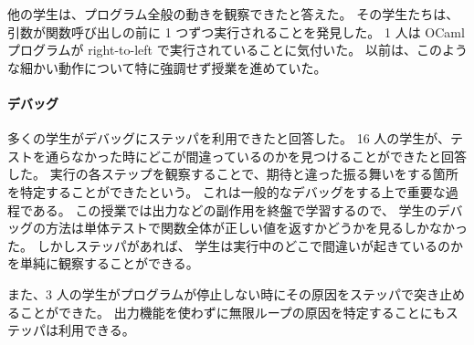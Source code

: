 他の学生は、プログラム全般の動きを観察できたと答えた。
その学生たちは、引数が関数呼び出しの前に 1 つずつ実行されることを発見した。
1 人は OCaml プログラムが right-to-left で実行されていることに気付いた。
以前は、このような細かい動作について特に強調せず授業を進めていた。

\paragraph{デバッグ}
多くの学生がデバッグにステッパを利用できたと回答した。
16 人の学生が、テストを通らなかった時にどこが間違っているのかを見つけることができたと回答した。
実行の各ステップを観察することで、期待と違った振る舞いをする箇所を特定することができたという。
これは一般的なデバッグをする上で重要な過程である。
この授業では出力などの副作用を終盤で学習するので、
学生のデバッグの方法は単体テストで関数全体が正しい値を返すかどうかを見るしかなかった。
しかしステッパがあれば、
学生は実行中のどこで間違いが起きているのかを単純に観察することができる。

また、3 人の学生がプログラムが停止しない時にその原因をステッパで突き止めることができた。
出力機能を使わずに無限ループの原因を特定することにもステッパは利用できる。
